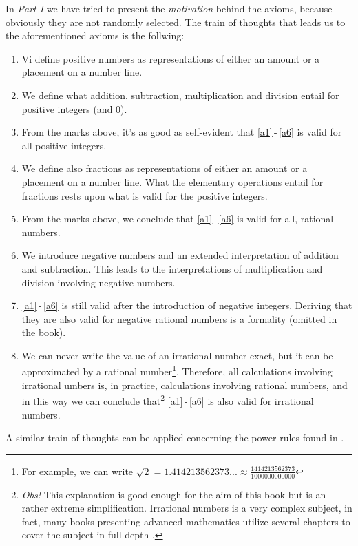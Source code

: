 \newpage
In \textsl{Part I} we have tried to present the \textsl{motivation} behind the axioms, because obviously they are not randomly selected. The train of thoughts that leads us to the aforementioned axioms is the follwing:
\begin{enumerate}
	\item Vi define positive numbers as representations of either an amount or a placement on a number line.
	\item We define what addition, subtraction, multiplication and division entail for positive integers (and 0).
	\item From the marks above, it's as good as self-evident that \eqref{a1}\,-\,\eqref{a6} is valid for all positive integers.
	\item We define also fractions as representations of either an amount or a placement on a number line. What the elementary operations entail for fractions rests upon what is valid for the positive integers.
	\item From the marks above, we conclude that \eqref{a1}\,-\,\eqref{a6} is valid for all, rational numbers.
	\item We introduce negative numbers and an extended interpretation of addition and subtraction. This leads to the interpretations of multiplication and division involving negative numbers.
	\item \eqref{a1}\,-\,\eqref{a6} is still valid after the introduction of negative integers. Deriving that they are also valid for negative rational numbers is a formality (omitted in the book).
	\item We can never write the value of an irrational number exact, but it can be approximated by a rational number\footnote{For example, we can write $ \sqrt{2}=1.414213562373...\approx\frac{1414213562373}{1000000000000} $}. Therefore, all calculations involving irrational umbers is, in practice, calculations involving rational numbers, and in this way we can conclude that\footnote{\textit{Obs!} This explanation is good enough for the aim of this book but is an rather extreme simplification. Irrational numbers is a very complex subject, in fact, many books presenting advanced mathematics utilize several chapters to cover the subject in full depth .} \eqref{a1}\,-\,\eqref{a6} is also valid for irrational numbers.
\end{enumerate}
A similar train of thoughts can be applied concerning the power-rules found in . 


